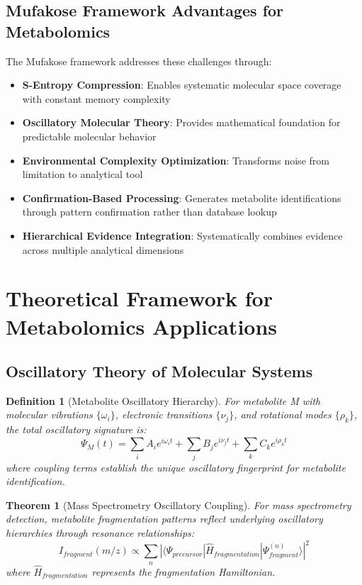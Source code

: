 \documentclass[12pt,a4paper]{article}
\newtheorem{theorem}{Theorem}
\newtheorem{definition}{Definition}
\begin{document}
\subsection{Mufakose Framework Advantages for Metabolomics}

The Mufakose framework addresses these challenges through:

\begin{itemize}
\item \textbf{S-Entropy Compression}: Enables systematic molecular space coverage with constant memory complexity
\item \textbf{Oscillatory Molecular Theory}: Provides mathematical foundation for predictable molecular behavior
\item \textbf{Environmental Complexity Optimization}: Transforms noise from limitation to analytical tool
\item \textbf{Confirmation-Based Processing}: Generates metabolite identifications through pattern confirmation rather than database lookup
\item \textbf{Hierarchical Evidence Integration}: Systematically combines evidence across multiple analytical dimensions
\end{itemize}

\section{Theoretical Framework for Metabolomics Applications}

\subsection{Oscillatory Theory of Molecular Systems}

\begin{definition}[Metabolite Oscillatory Hierarchy]
For metabolite M with molecular vibrations $\{\omega_i\}$, electronic transitions $\{\nu_j\}$, and rotational modes $\{\rho_k\}$, the total oscillatory signature is:
\begin{equation}
\Psi_M(t) = \sum_i A_i e^{i\omega_i t} + \sum_j B_j e^{i\nu_j t} + \sum_k C_k e^{i\rho_k t}
\end{equation}
where coupling terms establish the unique oscillatory fingerprint for metabolite identification.
\end{definition}

\begin{theorem}[Mass Spectrometry Oscillatory Coupling]
For mass spectrometry detection, metabolite fragmentation patterns reflect underlying oscillatory hierarchies through resonance relationships:
\begin{equation}
I_{fragment}(m/z) \propto \sum_n |\langle \Psi_{precursor} | \hat{H}_{fragmentation} | \Psi_{fragment}^{(n)} \rangle|^2
\end{equation}
where $\hat{H}_{fragmentation}$ represents the fragmentation Hamiltonian.
\end{theorem}
\end{document}
